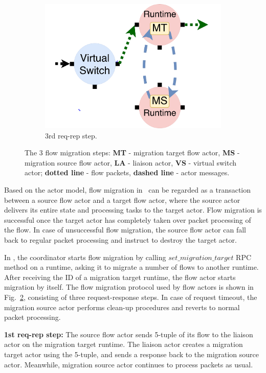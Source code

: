 \begin{figure}[!h]
\begin{subfigure}[t]{0.33\linewidth}
   \includegraphics[width=1.1\columnwidth]{chap-nfvactor/figure/nfactor-mig3.pdf}
   \caption{3rd req-rep step.}\label{fig:mig3} \end{subfigure}\hfill
 \caption{The 3 flow migration steps: \textbf{MT} - migration target flow actor, \textbf{MS} - migration source flow actor, \textbf{LA} - liaison actor, \textbf{VS} - virtual switch actor; \textbf{dotted line} - flow packets, \textbf{dashed line} - actor messages.}
\label{fig:mig}
\end{figure}

Based on the actor model, flow migration in \nfactor~can be regarded as a transaction between a source flow actor and a target flow actor, where the source actor delivers its entire state and processing tasks to the target actor. Flow migration is successful once the target actor has completely taken over packet processing of the flow. In case of unsuccessful flow migration, the source flow actor can fall back to regular packet processing and instruct to destroy the target actor.

In \nfactor, the coordinator starts flow migration by calling $set\_migration\_target$ RPC method on a runtime, asking it to migrate a number of flows to another runtime. After receiving the ID of a migration target runtime, the flow actor starts migration by itself. The flow migration protocol used by flow actors is shown in Fig.~\ref{fig:mig}, consisting of three request-response steps. In case of request timeout, the migration source actor performs clean-up procedures and reverts to normal packet processing.

\textbf{1st req-rep step:} The source flow actor sends 5-tuple of its flow to the liaison actor on the migration target runtime. The liaison actor creates a migration target actor using the 5-tuple, and sends a response back to the migration source actor. Meanwhile, migration source actor continues to process packets as usual.


